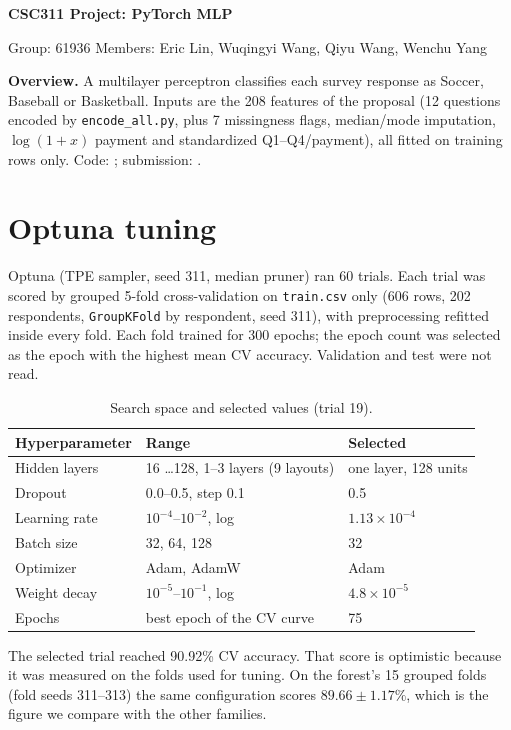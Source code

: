 \documentclass[10pt,letterpaper]{article}
\newcommand{\topic}[1]{\par\smallskip\textbf{#1}\quad}
\begin{document}
\begin{center}
{\Large\bfseries CSC311 Project: PyTorch MLP}\par
{\small Group: 61936 \quad Members: Eric Lin, Wuqingyi Wang, Qiyu Wang, Wenchu Yang}\par
\end{center}

\topic{Overview.}
A multilayer perceptron classifies each survey response as Soccer, Baseball or
Basketball. Inputs are the 208 features of the proposal (12 questions encoded by
\texttt{encode\_all.py}, plus 7 missingness flags, median/mode imputation,
$\log(1+x)$ payment and standardized Q1--Q4/payment), all fitted on training rows only.
Code: ; submission: .

\section{Optuna tuning}
Optuna (TPE sampler, seed 311, median pruner) ran 60 trials. Each trial was scored by
grouped 5-fold cross-validation on \texttt{train.csv} only (606 rows, 202 respondents,
\texttt{GroupKFold} by respondent, seed 311), with preprocessing refitted inside every fold.
Each fold trained for 300 epochs; the epoch count was selected as the epoch with the
highest mean CV accuracy. Validation and test were not read.

\begin{table}[ht]
\centering\small
\caption{Search space and selected values (trial 19).}
\begin{tabular}{lll}
\toprule
Hyperparameter & Range & Selected\\
\midrule
Hidden layers & 16 \dots 128, 1--3 layers (9 layouts) & one layer, 128 units\\
Dropout & 0.0--0.5, step 0.1 & 0.5\\
Learning rate & $10^{-4}$--$10^{-2}$, log & $1.13\times10^{-4}$\\
Batch size & 32, 64, 128 & 32\\
Optimizer & Adam, AdamW & Adam\\
Weight decay & $10^{-5}$--$10^{-1}$, log & $4.8\times10^{-5}$\\
Epochs & best epoch of the CV curve & 75\\
\bottomrule
\end{tabular}
\end{table}

The selected trial reached 90.92\% CV accuracy. That score is optimistic because it
was measured on the folds used for tuning. On the forest's 15 grouped folds
(fold seeds 311--313) the same configuration scores $89.66\pm1.17\%$, which is the
figure we compare with the other families.
\end{document}
